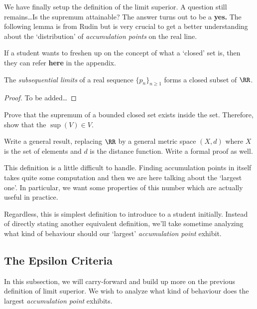 \documentclass[parskip=half, numbers=endperiod, 11pt]{scrartcl}
\begin{document}
We have finally setup the definition of the limit
superior. A question still remains\dots Is the supremum
attainable? The answer turns out to be a \textbf{yes.}
The following lemma is from Rudin but is very crucial
to get a better understanding about the `distribution' of
\emph{accumulation points} on the real line.

If a student wants to freshen up on the concept of what a
`closed' set is, then they can refer \textbf{here} in the
appendix.

\begin{lemma}
	The \emph{subsequential limits} of a real sequence
	$\{p_n\}_{n \ge 1}$ forms a closed subset of $\RR$.
\end{lemma}

\begin{proof}
	To be added\dots
\end{proof}

\begin{exercise}
	Prove that the supremum of a bounded closed set
	exists inside the set. Therefore, show that the
	$\sup(V) \in V$.
\end{exercise}


\begin{exercise}
	Write a general result, replacing $\RR$ by a general
	metric space $(X,d)$ where $X$ is the set of elements
	and $d$ is the distance function. Write a formal
	proof as well.
\end{exercise}


This definition is a little difficult to handle. Finding
accumulation points in itself takes quite some computation
and then we are here talking about the `largest one'. In
particular, we want some properties of this number which
are actually useful in practice.

Regardless, this is simplest definition to introduce to
a student initially. Instead of directly stating another
equivalent definition, we'll take sometime analyzing what
kind of behaviour should our `largest'
\emph{accumulation point} exhibit.

\subsection{The Epsilon Criteria}

In this subsection, we will carry-forward and build up
more on the previous definition of limit superior.
We wish to analyze what kind of behaviour does the
largest \emph{accumulation point} exhibits.
\end{document}
